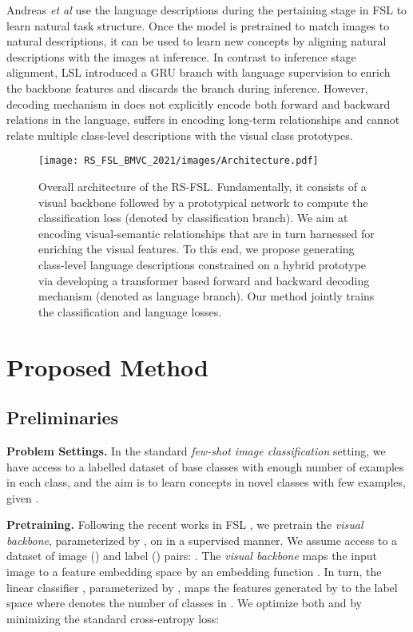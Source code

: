 \documentclass{bmvc2k}
\def\etal{\emph{et al}\bmvaOneDot}
\begin{document}
Andreas \etal \cite{andreas2017learning} use the language descriptions during the pertaining stage in FSL to learn natural task structure. Once the model is pretrained to match images to natural descriptions, it can be used to learn new concepts by aligning natural descriptions with the images at inference. In contrast to inference stage alignment, LSL \cite{mu2020shaping} introduced a GRU branch with language supervision to enrich the backbone features and discards the branch during inference. However, decoding mechanism in \cite{mu2020shaping,andreas2017learning} does not explicitly encode both forward and backward relations in the language, suffers in encoding long-term relationships and cannot relate multiple class-level descriptions with the visual class prototypes. 



\begin{figure}[t]
    \centering
    \texttt{[image: RS\_FSL\_BMVC\_2021/images/Architecture.pdf]}\vspace{-1em}
    \caption{Overall architecture of the RS-FSL. Fundamentally, it consists of a visual backbone followed by a prototypical network to compute the classification loss (denoted by classification branch). We aim at encoding visual-semantic relationships that are in turn harnessed for enriching the visual features. To this end, we propose generating class-level language descriptions constrained on a hybrid prototype via developing a transformer based forward and backward decoding mechanism (denoted as language branch). Our method jointly trains the classification and language losses.} 
\label{fig:overall_architecture}
\end{figure}
\section{Proposed Method}
\subsection{Preliminaries}
\label{subsection:Preliminaries}

\noindent \textbf{Problem Settings.} In the standard \textit{few-shot image classification} setting, we have access to a labelled dataset of base classes  with enough number of examples in each class, and the aim is to learn concepts in novel classes  with few examples, given . 

\noindent \textbf{Pretraining.}  Following the recent works in FSL \cite{chen2020new,simpleshot}, we pretrain the \textit{visual backbone}, parameterized by , on  in a supervised manner. We assume access to a dataset of image () and label () pairs: . The \textit{visual backbone} maps the input image  to a feature embedding space  by an embedding function . In turn, the linear classifier , parameterized by , maps the features generated by  to the label space  where  denotes the number of classes in . We optimize both  and  by minimizing the standard cross-entropy loss: \\
\end{document}
